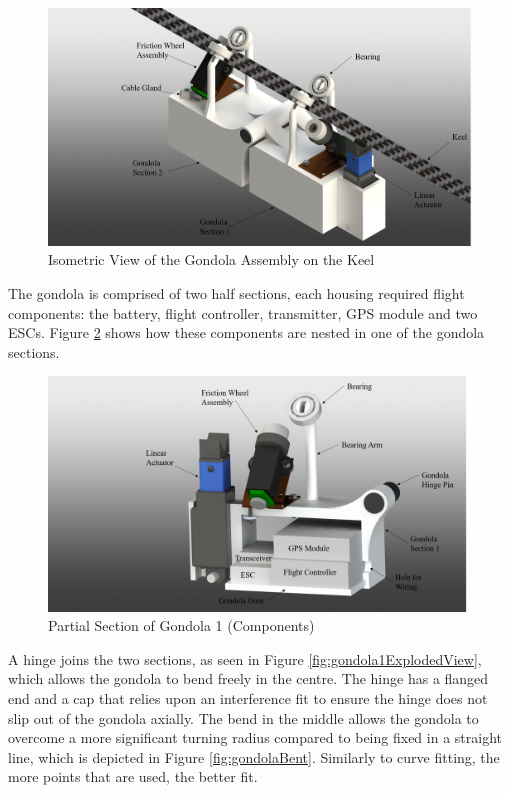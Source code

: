 \documentclass[../main.tex]{subfiles}
\begin{document}
\begin{figure}[H]
	\centering
	\includegraphics[width=.8\linewidth]{img/design/gondola/gondolaIsometric.png}
	\caption{Isometric View of the Gondola Assembly on the Keel}
	\label{fig:gondolaIsomeric}
\end{figure}

The gondola is comprised of two half sections, each housing required flight components: the battery, flight controller, transmitter, GPS module and two ESCs. Figure \ref{fig:gondolaPartialSection} shows how these components are nested in one of the gondola sections. 

\begin{figure}[H]
	\centering
	\includegraphics[width=.8\linewidth]{img/design/gondola/gondolaPartialSection.png}
	\caption{Partial Section of Gondola 1 (Components)}
	\label{fig:gondolaPartialSection}
\end{figure}

A hinge joins the two sections, as seen in Figure \ref{fig:gondola1ExplodedView}, which allows the gondola to bend freely in the centre. The hinge has a flanged end and a cap that relies upon an interference fit to ensure the hinge does not slip out of the gondola axially. The bend in the middle allows the gondola to overcome a more significant turning radius compared to being fixed in a straight line, which is depicted in Figure \ref{fig:gondolaBent}. Similarly to curve fitting, the more points that are used, the better fit. 
\end{document}

